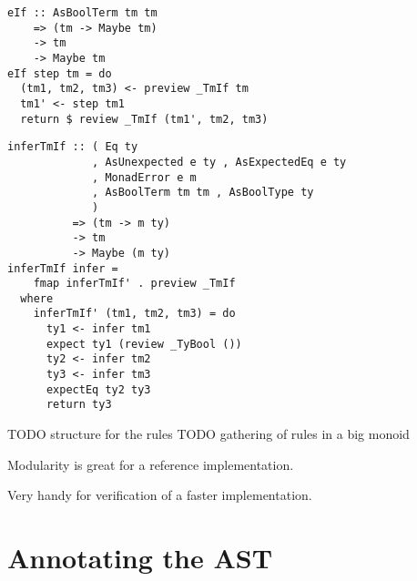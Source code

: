 \documentclass{beamer}
\begin{document}
\begin{frame}[fragile]
  \begin{verbatim}
eIf :: AsBoolTerm tm tm
    => (tm -> Maybe tm)
    -> tm
    -> Maybe tm
eIf step tm = do
  (tm1, tm2, tm3) <- preview _TmIf tm
  tm1' <- step tm1
  return $ review _TmIf (tm1', tm2, tm3)
  \end{verbatim}
\end{frame} 

\begin{frame}[fragile]
  \begin{verbatim}
inferTmIf :: ( Eq ty
             , AsUnexpected e ty , AsExpectedEq e ty
             , MonadError e m
             , AsBoolTerm tm tm , AsBoolType ty
             )
          => (tm -> m ty)
          -> tm
          -> Maybe (m ty)
inferTmIf infer =
    fmap inferTmIf' . preview _TmIf
  where
    inferTmIf' (tm1, tm2, tm3) = do
      ty1 <- infer tm1
      expect ty1 (review _TyBool ())
      ty2 <- infer tm2
      ty3 <- infer tm3
      expectEq ty2 ty3
      return ty3
  \end{verbatim}
\end{frame} 


\begin{frame}[c]
TODO structure for the rules
TODO gathering of rules in a big monoid
\end{frame} 

\begin{frame}[c]
  \begin{center}
   Modularity is great for a reference implementation.
  \end{center}
\end{frame} 

\begin{frame}[c]
  \begin{center}
    Very handy for verification of a faster implementation.
  \end{center}
\end{frame} 

\section{Annotating the AST}
\end{document}
